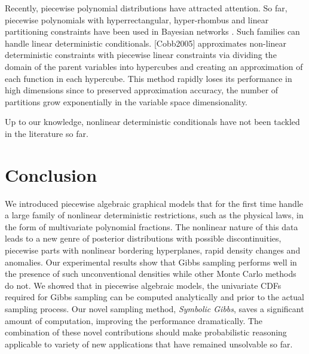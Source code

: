 \documentclass{article}
\begin{document}
Recently, piecewise polynomial distributions have attracted attention.
So far, piecewise polynomials with hyperrectangular, hyper-rhombus and linear partitioning constraints have been used in Bayesian networks \cite{shenoy2011inference,shenoy2012two,Sanner:12}.
Such families can handle linear deterministic conditionals.
{\color{red}[Cobb2005]} approximates non-linear deterministic constraints with piecewise linear constraints via
dividing the domain of the parent variables into hypercubes and creating an
approximation of each function in each hypercube.
This method rapidly loses its performance in high dimensions since to preserved approximation accuracy, the number of partitions grow exponentially in the variable space dimensionality. 

Up to our knowledge, nonlinear deterministic conditionals have not been tackled in the literature so far.  

 \section{Conclusion}
\label{sect:conclusion}

We introduced piecewise algebraic graphical models that for the first time handle a large family of nonlinear deterministic restrictions, such as the physical laws, in the form of multivariate polynomial fractions. The nonlinear nature of this data leads to a new genre of posterior distributions with possible discontinuities, 
piecewise parts with nonlinear bordering hyperplanes, rapid density changes and anomalies. Our experimental results show that Gibbs sampling performs well in the presence of such unconventional densities while other Monte Carlo methods do not. We showed that in piecewise algebraic models, the univariate CDFs required for Gibbs sampling can be computed analytically and prior to the actual sampling process. Our novel sampling method, \emph{Symbolic Gibbs}, saves a significant amount of computation, improving the performance dramatically. The combination of these novel contributions should make probabilistic reasoning applicable to variety of new applications that have remained unsolvable so far.      



\end{document}
